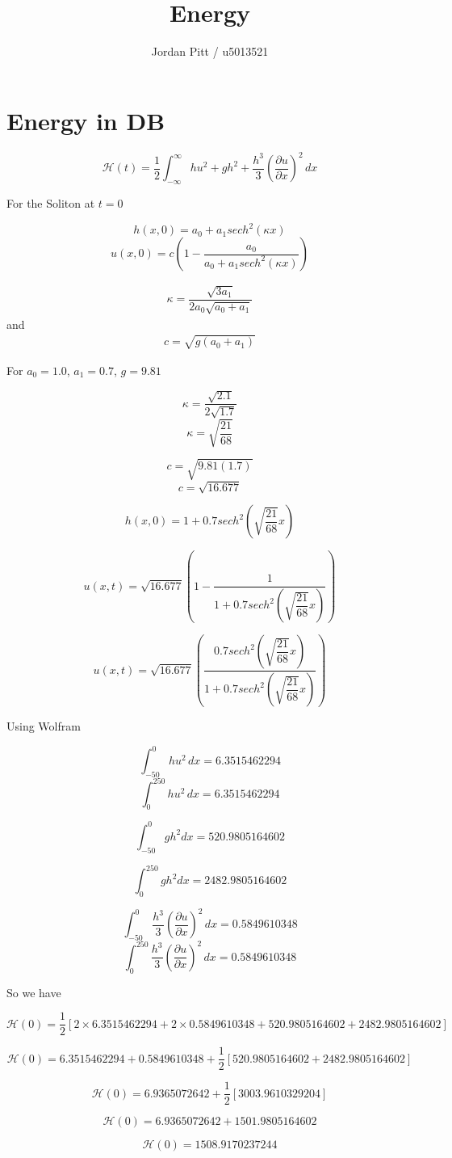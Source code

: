 \documentclass[12pt]{article}
\begin{document}
\title{Energy}
\author{Jordan Pitt / u5013521}

\section{Energy in DB}

\[\mathcal{H} (t) = \frac{1}{2}\int_{-\infty}^{\infty} hu^2 + gh^2 + \frac{h^3}{3} \left(\frac{\partial u}{\partial x}\right)^2\, dx \]

For the Soliton at $t = 0 $

\[h(x,0) = a_0 + a_1 sech^2\left(\kappa x\right)\]
\[u(x,0) = c\left(1 - \frac{a_0}{a_0 + a_1 sech^2\left(\kappa x\right)}\right)\]


\begin{gather}
\kappa = \dfrac{\sqrt{3a_1}}{2a_0 \sqrt{ a_0 + a_1}}
\end{gather}
and
\begin{gather}
c = \sqrt{g \left(a_0 + a_1\right)}
\end{gather}

For $a_0 = 1.0$,  $a_1 = 0.7$, $g = 9.81$

\[\kappa = \dfrac{\sqrt{2.1}}{2 \sqrt{ 1.7}}\]
\[\kappa = \sqrt{\dfrac{21}{68}}\]

\[c = \sqrt{9.81 \left(1.7\right)}\]
\[c = \sqrt{16.677}\]

\[h(x,0) = 1 + 0.7 sech^2\left(\sqrt{\dfrac{21}{68}}x\right)\]

\[u(x,t) = \sqrt{16.677}\left(1 - \frac{1}{1+ 0.7 sech^2\left(\sqrt{\dfrac{21}{68}} x\right)}\right)\]

\[u(x,t) = \sqrt{16.677}\left(\frac{0.7 sech^2\left(\sqrt{\dfrac{21}{68}} x\right)}{1+ 0.7 sech^2\left(\sqrt{\dfrac{21}{68}} x\right)}\right)\]

Using Wolfram

\[\int_{-50}^{0} hu^2 \, dx = 6.3515462294 \]
\[\int_{0}^{250} hu^2 \, dx = 6.3515462294\]

\[\int_{-50}^{0} gh^2  dx = 520.9805164602 \]

\[\int_{0}^{250} gh^2  dx = 2482.9805164602 \]


\[\int_{-50}^{0} \frac{h^3}{3} \left(\frac{\partial u}{\partial x}\right)^2\,  dx = 0.5849610348 \]
\[\int_{0}^{250} \frac{h^3}{3} \left(\frac{\partial u}{\partial x}\right)^2\,  dx = 0.5849610348 \]

So we have 

\[\mathcal{H} (0) = \frac{1}{2}\left[2\times 6.3515462294  + 2 \times 0.5849610348  + 520.9805164602 + 2482.9805164602\right] \]

\[\mathcal{H} (0) = 6.3515462294 +  0.5849610348  +  \frac{1}{2}\left[ 520.9805164602 + 2482.9805164602 \right] \]

\[\mathcal{H} (0) =  6.9365072642 +  \frac{1}{2}\left[ 3003.9610329204 \right] \]

\[\mathcal{H} (0) = 6.9365072642 +  1501.9805164602\]

\[\mathcal{H} (0) = 1508.9170237244 \]
\end{document}
